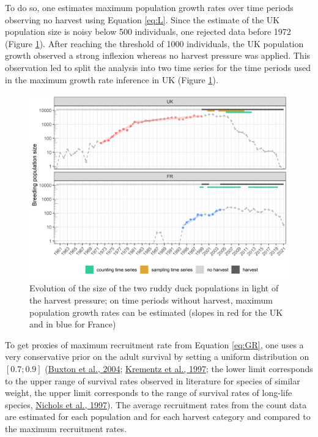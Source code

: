 \documentclass[
  english,
]{article}
\begin{document}
To do so, one estimates maximum population growth rates over time periods observing no harvest using Equation \eqref{eq:L}. Since the estimate of the UK population size is noisy below 500 individuals, one rejected data before 1972 (Figure \ref{fig:grts}). After reaching the threshold of 1000 individuals, the UK population growth observed a strong inflexion whereas no harvest pressure was applied. This observation led to split the analysis into two time series for the time periods used in the maximum growth rate inference in UK (Figure \ref{fig:grts}).

\begin{figure}[H]

{\centering \includegraphics[width=1\linewidth]{../Output/plot_3} 

}

\caption{Evolution of the size of the two ruddy duck populations in light of the harvest pressure; on time periods without harvest, maximum population growth rates can be estimated (slopes in red for the UK and in blue for France)}\label{fig:grts}
\end{figure}

To get proxies of maximum recruitment rate from Equation \eqref{eq:GR}, one uses a very conservative prior on the adult survival by setting a uniform distribution on \([0.7; 0.9]\) (\protect\hyperlink{ref-Buxton2004}{Buxton et al., 2004}; \protect\hyperlink{ref-Krementz1997}{Krementz et al., 1997}; the lower limit corresponds to the upper range of survival rates observed in literature for species of similar weight, the upper limit corresponds to the range of survival rates of long-life species, \protect\hyperlink{ref-Nichols1997}{Nichols et al., 1997}). The average recruitment rates from the count data are estimated for each population and for each harvest category and compared to the maximum recruitment rates.
\end{document}
